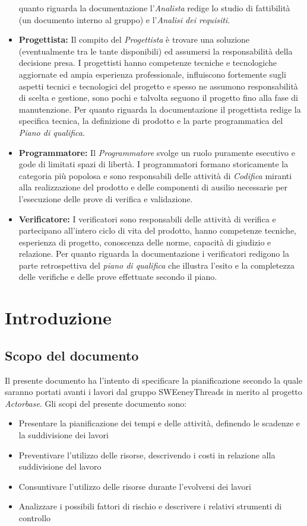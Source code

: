 \documentclass[a4paper]{report}
\newcommand{\mychapter}[2]{
	\setcounter{chapter}{#1}
	\setcounter{section}{0}
	\setcounter{subsection}{1}
	\chapter*{#2}
	\addcontentsline{toc}{chapter}{#2}
}
\begin{document}
\begin{appendices}
\begin{itemize}
				quanto riguarda la documentazione l'\emph{Analista} redige lo studio di fattibilità (un documento interno al gruppo) 
				e l'\emph{Analisi dei requisiti}.
				\item \textbf{Progettista:} Il compito del \emph{Progettista} è trovare una soluzione (eventualmente tra le tante disponibili) 
				ed assumersi la responsabilità della decisione presa. I progettisti hanno competenze tecniche e tecnologiche aggiornate 
				ed ampia esperienza professionale, influiscono fortemente sugli aspetti tecnici e tecnologici del progetto e spesso 
				ne assumono responsabilità di scelta e gestione, sono pochi e talvolta seguono il progetto fino alla fase di manutenzione. 
				Per quanto riguarda la documentazione il progettista redige la specifica tecnica, la definizione di prodotto e la parte 
				programmatica del \emph{Piano di qualifica}.
				\item \textbf{Programmatore:} Il \emph{Programmatore} svolge un ruolo puramente esecutivo e gode di limitati spazi di libertà. 
				I programmatori formano storicamente la categoria più popolosa e sono responsabili delle attività di \emph{Codifica} miranti 
				alla realizzazione del prodotto e delle componenti di ausilio necessarie per l'esecuzione delle prove di verifica e validazione.
				\item \textbf{Verificatore:} I verificatori sono responsabili delle attività di verifica e partecipano all'intero ciclo di vita 
				del prodotto, hanno competenze tecniche, esperienza di progetto, conoscenza delle norme, capacità di giudizio e relazione. Per 
				quanto riguarda la documentazione i verificatori redigono la parte retrospettiva del \emph{piano di qualifica} che illustra l'esito 
				e la completezza delle verifiche e delle prove effettuate secondo il piano.
			\end{itemize}
	\end{appendices}
	
	\mychapter{1}{Introduzione}
		\section{Scopo del documento}
			Il presente documento ha l'intento di specificare la pianificazione secondo la quale saranno portati avanti i 
			lavori dal gruppo SWEeneyThreads in merito al progetto \emph{Actorbase}.
			Gli scopi del presente documento sono:
			\begin{itemize}
				\item Presentare la pianificazione dei tempi e delle attività, definendo le scadenze e la suddivisione dei lavori
				\item Preventivare l’utilizzo delle risorse, descrivendo i costi in relazione alla suddivisione del lavoro
				\item Consuntivare l’utilizzo delle risorse durante l’evolversi dei lavori
				\item Analizzare i possibili fattori di rischio e descrivere i relativi strumenti di controllo
			\end{itemize}
\end{document}
